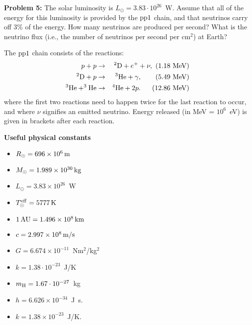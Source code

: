 \documentclass[12pt]{article}
\begin{document}
{\bf Problem 5:} The solar luminosity is $L_\odot = 3.83\cdot
10^{26}$~W. Assume that all of the energy for this luminosity is
provided by the ${\rm pp1}$ chain, and that neutrinos carry off 3\% of
the energy. How many neutrinos are produced per second? What is the
neutrino flux (i.e., the number of neutrinos per second per cm$^2$) at
Earth?

The ${\rm pp1}$ chain consists of the reactions:
\begin{eqnarray}
  p + p &\rightarrow& ^2{\rm D} + e^+ + \nu,\ (1.18~{\rm MeV})\nonumber \\
  ^2{\rm D} + p &\rightarrow& ^3{\rm He} + \gamma,\ \ \ \ \ \ (5.49~{\rm MeV}) \nonumber \\
  ^3{\rm He} + ^3{\rm He} &\rightarrow& ^4{\rm He} + 2p.\ \ \ \ \ (12.86~{\rm MeV})
\end{eqnarray}
where the first two reactions need to happen twice for the last
reaction to occur, and where $\nu$ signifies an emitted
neutrino. Energy released (in MeV = $10^6$~eV) is given in brackets
after each reaction.


{\bf Useful physical constants}
\begin{itemize}
  \item $R_{\odot} = 696 \times 10^6\,{\rm m}$
  \item $M_{\odot} = 1.989 \times 10^{30}\,{\rm kg}$
  \item $L_{\odot} = 3.83 \times 10^{26}$~W
  \item $T^{\rm eff}_{\odot} = 5777\,{\rm K}$
  \item $1\,{\rm AU} = 1.496 \times 10^8\,{\rm km}$
  \item $c = 2.997 \times 10^8\,{\rm m/s}$
  \item $G = 6.674 \times 10^{-11}$~Nm$^2$/kg$^2$
  \item $k = 1.38\cdot10^{-23}$~J/K
  \item $m_{\rm H} = 1.67\cdot10^{-27}$~kg
  \item $h = 6.626 \times 10^{-34}$~J~s.
  \item $k = 1.38 \times 10^{-23}$~J/K.
\end{itemize}
\end{document}
